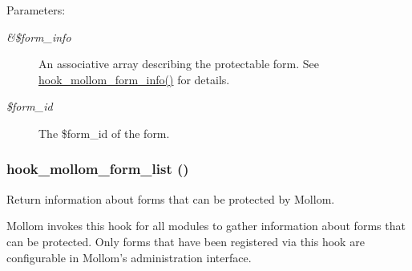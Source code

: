 \begin{Desc}
\item[Parameters:]
\begin{description}
\item[{\em \&\$form\_\-info}]An associative array describing the protectable form. See \hyperlink{group__mollom__api_ga5150fd4fabe048cbdeb41ec10908658}{hook\_\-mollom\_\-form\_\-info()} for details. \item[{\em \$form\_\-id}]The \$form\_\-id of the form. \end{description}
\end{Desc}
\hypertarget{group__mollom__api_gdd309b0309f638d79b17a686ea96f564}{
\subsubsection[{hook\_\-mollom\_\-form\_\-list}]{\setlength{\rightskip}{0pt plus 5cm}hook\_\-mollom\_\-form\_\-list ()}}
\label{group__mollom__api_gdd309b0309f638d79b17a686ea96f564}


Return information about forms that can be protected by Mollom.

Mollom invokes this hook for all modules to gather information about forms that can be protected. Only forms that have been registered via this hook are configurable in Mollom's administration interface.

